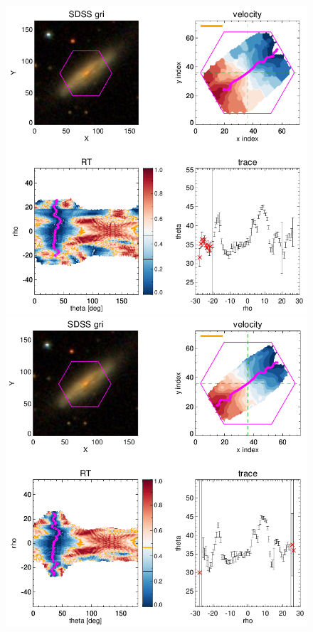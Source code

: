 \begin{figure}
    \centering
    \includegraphics[width=\columnwidth]{images/RadonPlots/RT-SNIPS-NEW/7977-12704-VOR10-MILESHC-MILESHC-1-SNIP.png}
    \includegraphics[width=\columnwidth]{images/RadonPlots/RT-SNIPS-NEW/7977-12704-SPX-MILESHC-MILESHC-1-SNIP.png}

\end{figure}
